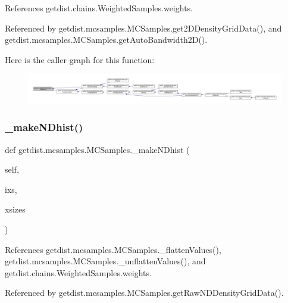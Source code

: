 References getdist.\+chains.\+Weighted\+Samples.\+weights.



Referenced by getdist.\+mcsamples.\+M\+C\+Samples.\+get2\+D\+Density\+Grid\+Data(), and getdist.\+mcsamples.\+M\+C\+Samples.\+get\+Auto\+Bandwidth2\+D().

Here is the caller graph for this function\+:
\nopagebreak
\begin{figure}[H]
\begin{center}
\leavevmode
\includegraphics[width=350pt]{classgetdist_1_1mcsamples_1_1MCSamples_a0da5ffb0dd8b41cea131a5cb8fd9202f_icgraph}
\end{center}
\end{figure}
\mbox{\label{classgetdist_1_1mcsamples_1_1MCSamples_a9b4f328726e9e918a2b9a80c7fd614c5}} 
\subsubsection{\texorpdfstring{\+\_\+make\+N\+Dhist()}{\_makeNDhist()}}
{\footnotesize\ttfamily def getdist.\+mcsamples.\+M\+C\+Samples.\+\_\+make\+N\+Dhist (\begin{DoxyParamCaption}\item[{}]{self,  }\item[{}]{ixs,  }\item[{}]{xsizes }\end{DoxyParamCaption})\hspace{0.3cm}{\ttfamily [private]}}



References getdist.\+mcsamples.\+M\+C\+Samples.\+\_\+flatten\+Values(), getdist.\+mcsamples.\+M\+C\+Samples.\+\_\+unflatten\+Values(), and getdist.\+chains.\+Weighted\+Samples.\+weights.



Referenced by getdist.\+mcsamples.\+M\+C\+Samples.\+get\+Raw\+N\+D\+Density\+Grid\+Data().


